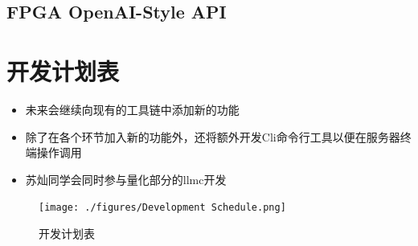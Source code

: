 \documentclass[AutoFakeBold,AutoFakeSlant,language=chinese,degree=bachelor]{sustechthesis}
\begin{document}
\subsection{FPGA OpenAI-Style API}

\section{开发计划表}
\begin{itemize}
    \item 未来会继续向现有的工具链中添加新的功能
    \item 除了在各个环节加入新的功能外，还将额外开发Cli命令行工具以便在服务器终端操作调用
    \item 苏灿同学会同时参与量化部分的llmc开发
\end{itemize}
\begin{figure}[H]
    \centering
    \texttt{[image: ./figures/Development Schedule.png]}
    \caption{开发计划表}
\end{figure}
\end{document}
